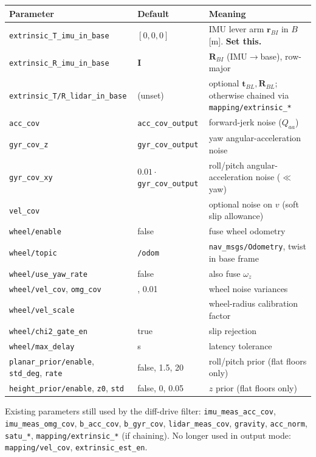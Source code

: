 \documentclass[11pt,a4paper]{article}
\newcommand{\f}[1]{\texttt{#1}}
\newcommand{\R}{\mathbf{R}}
\begin{document}
{\small\begin{longtable}{@{}>{\raggedright\arraybackslash}p{5.2cm}>{\raggedright\arraybackslash}p{2.9cm}>{\raggedright\arraybackslash}p{7.0cm}@{}}
\toprule
Parameter & Default & Meaning\\
\midrule\endhead
\f{extrinsic\_T\_imu\_in\_base} & $[0,0,0]$ & IMU lever arm $\mathbf r_{BI}$ in $B$ [m]. \textbf{Set this.}\\
\f{extrinsic\_R\_imu\_in\_base} & $\mathbf I$ & $\R_{BI}$ (IMU$\to$base), row-major\\
\f{extrinsic\_T/R\_lidar\_in\_base} & (unset) & optional $\mathbf t_{BL},\R_{BL}$; otherwise chained via \f{mapping/extrinsic\_*}\\
\f{acc\_cov} & \f{acc\_cov\_output} & forward-jerk noise ($Q_{aa}$)\\
\f{gyr\_cov\_z} & \f{gyr\_cov\_output} & yaw angular-acceleration noise\\
\f{gyr\_cov\_xy} & $0.01\cdot$\f{gyr\_cov\_output} & roll/pitch angular-acceleration noise ($\ll$ yaw)\\
\f{vel\_cov} & 0 & optional noise on $v$ (soft slip allowance)\\
\f{wheel/enable} & false & fuse wheel odometry\\
\f{wheel/topic} & \f{/odom} & \f{nav\_msgs/Odometry}, twist in base frame\\
\f{wheel/use\_yaw\_rate} & false & also fuse $\omega_z$\\
\f{wheel/vel\_cov}, \f{omg\_cov} & 0.0025, 0.01 & wheel noise variances\\
\f{wheel/vel\_scale} & 1.0 & wheel-radius calibration factor\\
\f{wheel/chi2\_gate\_en} & true & slip rejection\\
\f{wheel/max\_delay} & 0.1 s & latency tolerance\\
\f{planar\_prior/enable}, \f{std\_deg}, \f{rate} & false, 1.5, 20 & roll/pitch prior (flat floors only)\\
\f{height\_prior/enable}, \f{z0}, \f{std} & false, 0, 0.05 & $z$ prior (flat floors only)\\
\bottomrule
\end{longtable}}

Existing parameters still used by the diff-drive filter: \f{imu\_meas\_acc\_cov},
\f{imu\_meas\_omg\_cov}, \f{b\_acc\_cov}, \f{b\_gyr\_cov}, \f{lidar\_meas\_cov},
\f{gravity}, \f{acc\_norm}, \f{satu\_*}, \f{mapping/extrinsic\_*} (if chaining).
No longer used in output mode: \f{mapping/vel\_cov}, \f{extrinsic\_est\_en}.
\end{document}
